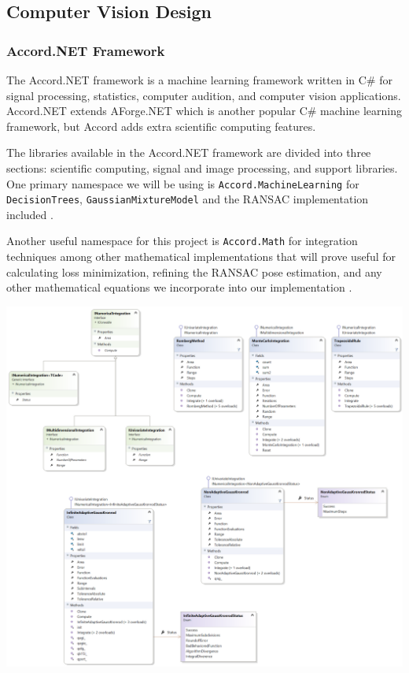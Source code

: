 \documentclass[12pt]{article}
\let\origfigure=\figure
\let\endorigfigure=\endfigure
\renewenvironment{figure}[1][]{%
  \origfigure[H]
}{%
  \endorigfigure
}
\begin{document}
\subsection{Computer Vision Design}\label{computer-vision-design}

\subsubsection{Accord.NET Framework}\label{accord.net-framework}

The Accord.NET framework is a machine learning framework written in C\#
for signal processing, statistics, computer audition, and computer
vision applications. Accord.NET extends AForge.NET which is another
popular C\# machine learning framework, but Accord adds extra scientific
computing features.

The libraries available in the Accord.NET framework are divided into
three sections: scientific computing, signal and image processing, and
support libraries. One primary namespace we will be using is
\texttt{Accord.MachineLearning} for \texttt{DecisionTrees},
\texttt{GaussianMixtureModel} and the RANSAC implementation included
\autocite{accord}.

Another useful namespace for this project is \texttt{Accord.Math} for
integration techniques among other mathematical implementations that
will prove useful for calculating loss minimization, refining the RANSAC
pose estimation, and any other mathematical equations we incorporate
into our implementation \autocite{accord}.

\begin{figure}
\centering
\includegraphics{Pictures/Accord.Math.Integration.png}
\caption{Accord.Math.Integration Classes Provided under the Creative
Commons Attribution/Share-Alike License}
\end{figure}
\end{document}
